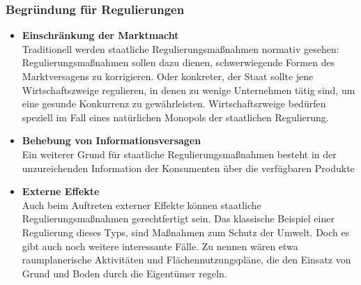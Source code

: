 \documentclass[10pt]{scrartcl}
\begin{document}
\subsubsection{Begründung für Regulierungen}
\begin{itemize}
\item {\bf Einschränkung der Marktmacht} \\
Traditionell werden staatliche Regulierungsmaßnahmen normativ gesehen: Regulierungsmaßnahmen sollen dazu dienen, schwerwiegende Formen des Marktversagens zu korrigieren. Oder konkreter, der Staat sollte jene Wirtschaftszweige regulieren, in denen zu wenige Unternehmen tätig sind, um eine gesunde Konkurrenz zu gewährleisten. Wirtschaftszweige bedürfen speziell im Fall eines natürlichen Monopols der staatlichen Regulierung. 
\item {\bf Behebung von Informationsversagen} \\
Ein weiterer Grund für staatliche Regulierungsmaßnahmen besteht in der unzureichenden Information der Konsumenten über die verfügbaren Produkte
\item {\bf Externe Effekte} \\
Auch beim Auftreten externer Effekte können staatliche Regulierungsmaßnahmen gerechtfertigt sein. Das klassische Beispiel einer Regulierung dieses Typs, sind Maßnahmen zum Schutz der Umwelt. Doch es gibt auch noch weitere interessante Fälle. Zu nennen wären etwa raumplanerische Aktivitäten und Flächennutzungspläne, die den Einsatz von Grund und Boden durch die Eigentümer regeln.
\end{itemize}
\end{document}
